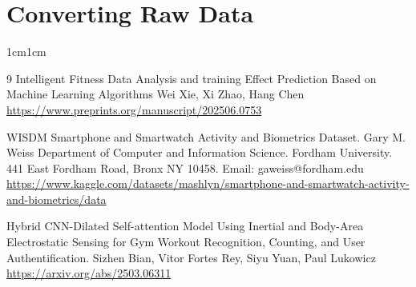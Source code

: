 \documentclass[11pt,a4paper]{article}
\begin{document}
\section{Converting Raw Data}
\begin{adjustwidth}{1cm}{1cm}



\end{adjustwidth}

\begin{thebibliography}{9}
Intelligent Fitness Data Analysis and training Effect Prediction Based on Machine Learning Algorithms Wei Xie, Xi Zhao, Hang Chen
\url{https://www.preprints.org/manuscript/202506.0753}

WISDM Smartphone and Smartwatch Activity and Biometrics Dataset. Gary M. Weiss Department of Computer and Information Science. Fordham University. 441 East Fordham Road, Bronx NY 10458. Email: gaweiss@fordham.edu
\url{https://www.kaggle.com/datasets/mashlyn/smartphone-and-smartwatch-activity-and-biometrics/data}

Hybrid CNN-Dilated Self-attention Model Using Inertial and Body-Area Electrostatic Sensing for Gym Workout Recognition, Counting, and User Authentification. Sizhen Bian, Vitor Fortes Rey, Siyu Yuan, Paul Lukowicz
\url{https://arxiv.org/abs/2503.06311}

\end{thebibliography}
\end{document}
